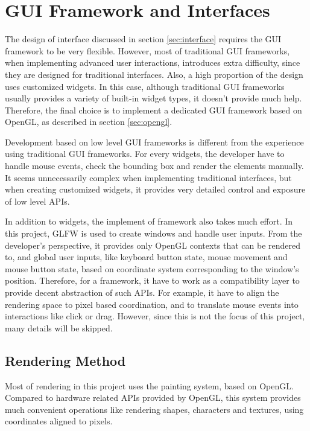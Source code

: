 \documentclass[msc,deptreport, cs]{infthesis}
\begin{document}
\section{GUI Framework and Interfaces}

The design of interface discussed in section \ref{sec:interface} requires the GUI framework to be very flexible. However, most of traditional GUI frameworks, when implementing advanced user interactions, introduces extra difficulty, since they are designed for traditional interfaces. Also, a high proportion of the design uses customized widgets. In this case, although traditional GUI frameworks usually provides a variety of built-in widget types, it doesn't provide much help. Therefore, the final choice is to implement a dedicated GUI framework based on OpenGL, as described in section \ref{sec:opengl}.

Development based on low level GUI frameworks is different from the experience using traditional GUI frameworks. For every widgets, the developer have to handle mouse events, check the bounding box and render the elements manually. It seems unnecessarily complex when implementing traditional interfaces, but when creating customized widgets, it provides very detailed control and exposure of low level APIs.

In addition to widgets, the implement of framework also takes much effort. In this project, GLFW is used to create windows and handle user inputs. From the developer's perspective, it provides only OpenGL contexts that can be rendered to, and global user inputs, like keyboard button state, mouse movement and mouse button state, based on coordinate system corresponding to the window's position. Therefore, for a framework, it have to work as a compatibility layer to provide decent abstraction of such APIs. For example, it have to align the rendering space to pixel based coordination, and to translate mouse events into interactions like click or drag. However, since this is not the focus of this project, many details will be skipped.

\subsection{Rendering Method}

Most of rendering in this project uses the painting system, based on OpenGL. Compared to hardware related APIs provided by OpenGL, this system provides much convenient operations like rendering shapes, characters and textures, using coordinates aligned to pixels.
\end{document}
